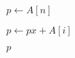 
\begin{algorithm}[H]
  \begin{algorithmic}[1]
     
      \State $p \gets A[n]$

      \hStatex
		\State $p \gets px + A[i]$
      \EndFor

      \hStatex
      \State \Return $p$
    \EndProcedure
  \end{algorithmic}
\end{algorithm}
